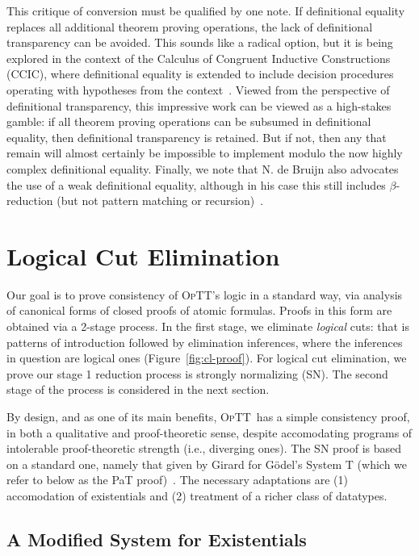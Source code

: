 \documentclass{fundam}
\newcommand{\optt}{\textsc{OpTT}}
\begin{document}
This critique of conversion must be qualified by one note.  If
definitional equality replaces all additional theorem proving
operations, the lack of definitional transparency can be avoided.
This sounds like a radical option, but it is being explored in the
context of the Calculus of Congruent Inductive Constructions (CCIC),
where definitional equality is extended to include decision procedures
operating with hypotheses from the context~\cite{blanqui+08}.  Viewed
from the perspective of definitional transparency, this impressive
work can be viewed as a high-stakes gamble: if all theorem proving
operations can be subsumed in definitional equality, then definitional
transparency is retained.  But if not, then any that remain will
almost certainly be impossible to implement modulo the now highly
complex definitional equality.  Finally, we note that N. de Bruijn
also advocates the use of a weak definitional equality, although in
his case this still includes $\beta$-reduction (but not pattern
matching or recursion)~\cite{debruijn91}.  

\section{Logical Cut Elimination}
\label{sec:cut_elim}

Our goal is to prove consistency of \optt's logic in a standard way,
via analysis of canonical forms of closed proofs of atomic formulas.
Proofs in this form are obtained via a 2-stage process.  In the first
stage, we eliminate \emph{logical} cuts: that is patterns of
introduction followed by elimination inferences, where the inferences
in question are logical ones (Figure~\ref{fig:cl-proof}).  For logical
cut elimination, we prove our stage 1 reduction process is strongly
normalizing (SN).  The second stage of the process is considered in
the next section.

By design, and as one of its main benefits, \optt\ has a simple
consistency proof, in both a qualitative and proof-theoretic sense,
despite accomodating programs of intolerable proof-theoretic strength
(i.e., diverging ones).  The SN proof is based on a standard one,
namely that given by Girard for G\"odel's System T (which we refer to
below as the PaT proof)~\cite{pat}.  The necessary adaptations are (1)
accomodation of existentials and (2) treatment of a richer class of
datatypes.  

\subsection{A Modified System for Existentials}
\label{sec:mod-ex}
\end{document}
